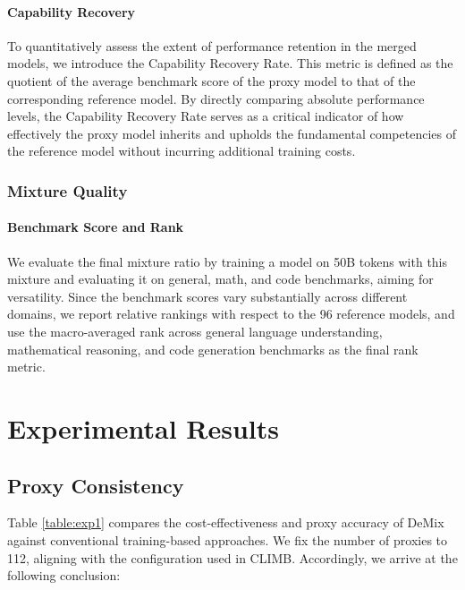 \documentclass{article}
\theoremstyle{plain}
\theoremstyle{definition}
\theoremstyle{remark}
\begin{document}
\paragraph{Capability Recovery} To quantitatively assess the extent of performance retention in the merged models, we introduce the Capability Recovery Rate. This metric is defined as the quotient of the average benchmark score of the proxy model to that of the corresponding reference model. By directly comparing absolute performance levels, the Capability Recovery Rate serves as a critical indicator of how effectively the proxy model inherits and upholds the fundamental competencies of the reference model without incurring additional training costs.

\subsubsection{Mixture Quality}
\paragraph{Benchmark Score and Rank} We evaluate the final mixture ratio by training a model on 50B tokens with this mixture and evaluating it on general, math, and code benchmarks, aiming for versatility. Since the benchmark scores vary substantially across different domains, we report relative rankings with respect to the 96 reference models, and use the macro-averaged rank across general language understanding, mathematical reasoning, and code generation benchmarks as the final rank metric.


\section{Experimental Results}


\subsection{Proxy Consistency}

Table \ref{table:exp1} compares the cost-effectiveness and proxy accuracy of DeMix against conventional training-based approaches. We fix the number of proxies to 112, aligning with the configuration used in CLIMB. Accordingly, we arrive at the following conclusion:
\end{document}
